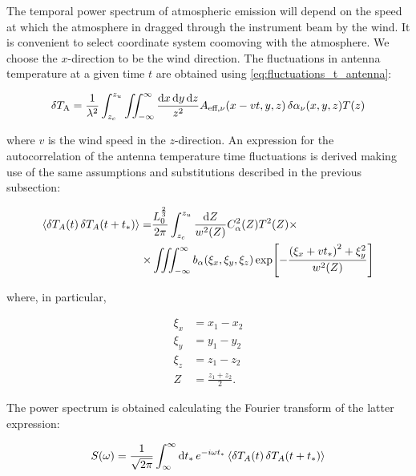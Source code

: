 The temporal power spectrum of atmospheric emission will depend on the
speed at which the atmosphere in dragged through the instrument beam by the
wind. It is convenient to select coordinate system coomoving with the
atmosphere. We choose the $x$-direction to be the wind direction. The
fluctuations in antenna temperature at a given time $t$ are obtained using
\autoref{eq:fluctuations_t_antenna}:

\begin{equation}
        \var{T_\text{A}} = \frac{1}{\lambda^2} \int^{z_u}_{z_c}
        \iint^\infty_{-\infty} \frac{\dd{x}\dd{y}\dd{z}}{z^2}
        A_{\text{eff},\nu}\qty(x - vt,y,z)
        \var{\alpha_\nu\qty(x,y,z) T\qty(z)}
\end{equation}

where $v$ is the wind speed in the $z$-direction. An expression for the
autocorrelation of the antenna temperature time fluctuations is derived
making use of the same assumptions and substitutions described in the
previous subsection:

\begin{equation}
        \begin{split}
                \expval{\var{T_A\qty(t)}\var{T_A\qty(t + t_*)}} = &
                \frac{L^{\frac{2}{3}}_0}{2\pi} \int^{z_u}_{z_c}
                \frac{\dd{Z}}{w^2\qty(Z)} C^2_\alpha\qty(Z)T^2\qty(Z) \times
                \\ \times
                & \iiint^\infty_{-\infty} b_\alpha\qty(\xi_x,\xi_y,\xi_z)
                \exp[-\frac{\qty(\xi_x + vt_*)^2 + \xi^2_y}{w^2\qty(Z)}]
        \end{split}
\end{equation}

where, in particular,

\begin{align}
         \xi_x & = x_1 - x_2 \\
         \xi_y & = y_1 - y_2 \\
         \xi_z & = z_1 - z_2 \\
         Z & = \frac{z_1 + z_2}{2}.
\end{align}

The power spectrum is obtained calculating the Fourier transform of the
latter expression:

\begin{equation}
        S\qty(\omega) = \frac{1}{\sqrt{2\pi}} \int^\infty_\infty \dd{t_*}
        e^{-i\omega t_*} \expval{\var{T_A\qty(t)}\var{T_A\qty(t + t_*)}}
\end{equation}

